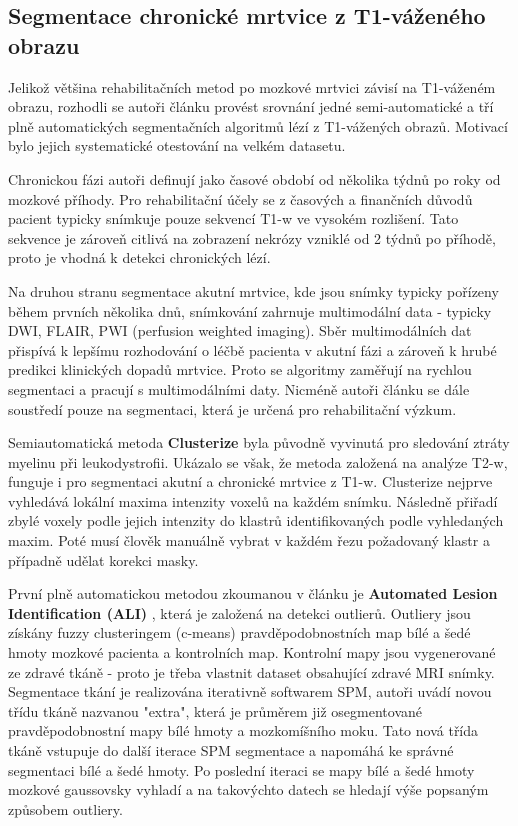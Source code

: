 \documentclass[11pt]{article}
\begin{document}
\subsection{Segmentace chronické mrtvice z T1-váženého obrazu}
Jelikož většina rehabilitačních metod po mozkové mrtvici závisí na T1-váženém obrazu, rozhodli se autoři článku \cite{Ito2018} provést srovnání jedné semi-automatické a tří plně automatických segmentačních algoritmů lézí z T1-vážených obrazů. Motivací bylo jejich systematické otestování na velkém datasetu.

Chronickou fázi autoři definují jako časové období od několika týdnů po roky od mozkové příhody. Pro rehabilitační účely se z časových a finančních důvodů pacient typicky snímkuje pouze sekvencí T1-w ve vysokém rozlišení. Tato sekvence je zároveň citlivá na zobrazení nekrózy vzniklé od 2 týdnů po příhodě, proto je vhodná k detekci chronických lézí.

Na druhou stranu segmentace akutní mrtvice, kde jsou snímky typicky pořízeny během prvních několika dnů, snímkování zahrnuje multimodální data - typicky DWI, FLAIR, PWI (perfusion weighted imaging). Sběr multimodálních dat přispívá k lepšímu rozhodování o léčbě pacienta v akutní fázi a zároveň k hrubé predikci klinických dopadů mrtvice. Proto se algoritmy zaměřují na rychlou segmentaci a pracují s multimodálními daty. Nicméně autoři článku se dále soustředí pouze na segmentaci, která je určená pro rehabilitační výzkum.

Semiautomatická metoda \textbf{Clusterize} byla původně vyvinutá pro sledování ztráty myelinu při leukodystrofii. Ukázalo se však, že metoda založená na analýze T2-w, funguje i pro segmentaci akutní a chronické mrtvice z T1-w. \cite{DEHAAN201569} Clusterize nejprve vyhledává lokální maxima intenzity voxelů na každém snímku. Následně přiřadí zbylé voxely podle jejich intenzity do klastrů identifikovaných podle vyhledaných maxim. Poté musí člověk manuálně vybrat v každém řezu požadovaný klastr a případně udělat korekci masky.

První plně automatickou metodou zkoumanou v článku \cite{Ito2018} je \textbf{Automated Lesion Identification (ALI)} \cite{ali}, která je založená na detekci outlierů. Outliery jsou získány fuzzy clusteringem (c-means) pravděpodobnostních map bílé a šedé hmoty mozkové pacienta a kontrolních map. Kontrolní mapy jsou vygenerované ze zdravé tkáně - proto je třeba vlastnit dataset obsahující zdravé MRI snímky. Segmentace tkání je realizována iterativně softwarem \alert{SPM}, autoři uvádí novou třídu tkáně nazvanou "extra", která je průměrem již osegmentované pravděpodobnostní mapy bílé hmoty a mozkomíšního moku. Tato nová třída tkáně vstupuje do další iterace SPM segmentace a napomáhá ke správné segmentaci bílé a šedé hmoty. Po poslední iteraci se mapy bílé a šedé hmoty mozkové gaussovsky vyhladí a na takovýchto datech se hledají výše popsaným způsobem outliery.
\end{document}
